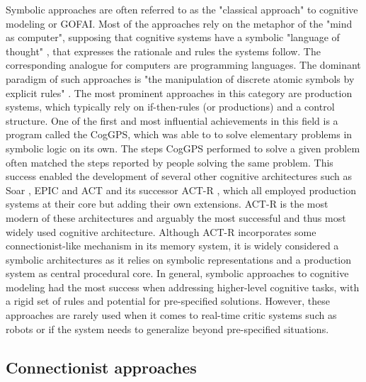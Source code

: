 Symbolic approaches are often referred to as the "classical approach" to cognitive modeling or \acf{GOFAI}.
Most of the approaches rely on the metaphor of the "mind as computer", supposing that cognitive systems have a symbolic "language of thought" \cite{Fodor1975}, that expresses the rationale and rules the systems follow.
The corresponding analogue for computers are programming languages.
The dominant paradigm of such approaches is "the manipulation of discrete atomic symbols by explicit rules" \cite{Levy2008}.
The most prominent approaches in this category are production systems, which typically rely on if-then-rules (or productions) and a control structure.
One of the first and most influential achievements in this field is a program called the \ac{CogGPS}, which was able to to solve elementary problems in symbolic logic on its own.
The steps \ac{CogGPS} performed to solve a given problem often matched the steps reported by people solving the same problem.
This success enabled the development of several other cognitive architectures such as Soar \cite{Laird1987}, \ac{EPIC} \cite{Kieras1997} and \ac{ACT} \cite{Anderson1983} and its successor \ac{ACT-R} \cite{Anderson1996}, which all employed production systems at their core but adding their own extensions.
\ac{ACT-R} is the most modern of these architectures and arguably the most successful and thus most widely used cognitive architecture.
Although \ac{ACT-R} incorporates some connectionist-like mechanism in its memory system, it is widely considered a symbolic architectures as it relies on symbolic representations and a production system as central procedural core.
In general, symbolic approaches to cognitive modeling had the most success when addressing higher-level cognitive tasks, with a rigid set of rules and potential for pre-specified solutions.
However, these approaches are rarely used when it comes to real-time critic systems such as robots or if the system needs to generalize beyond pre-specified situations.

\subsection{Connectionist approaches}%
\label{subsec:connectionist_approaches}

